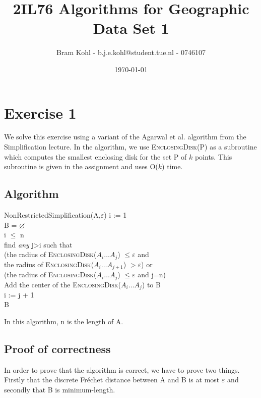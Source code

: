 \documentclass[a4paper,11pt]{article}
\title{
	2IL76 Algorithms for Geographic Data Set 1 \\
}
\author{
	Bram Kohl - b.j.e.kohl@student.tue.nl - 0746107
}
\date{\today}
\begin{document}
	\maketitle
	
\section*{Exercise 1}
We solve this exercise using a variant of the Agarwal et al. algorithm from the Simplification lecture. In the algorithm, we use \textsc{EnclosingDisk(P)} as a subroutine which computes the smallest enclosing disk for the set P of $k$ points. This subroutine is given in the assignment and uses O($k$) time.\\
\subsection*{Algorithm}
\begin{algorithm}{NonRestrictedSimplification}{(A,$\varepsilon$)}
	i := 1\\
	B = $\varnothing$\\
	\qwhile i $\leq$ n \\
	find \textit{any} j>i such that \\
	\hspace{4ex} (the radius of \textsc{EnclosingDisk($A_i\dots A_j$)} $\leq \varepsilon$ and\\
	\hspace{4ex} the radius of \textsc{EnclosingDisk($A_i\dots A_{j+1}$)} $> \varepsilon$) or\\
	\hspace{4ex} (the radius of \textsc{EnclosingDisk($A_i\dots A_j$)} $\leq \varepsilon$ and j=n)\\
	Add the center of the \textsc{EnclosingDisk($A_i\dots A_j$)} to B\\
	i := j + 1 \qend \\
	\qreturn B
\end{algorithm} 
In this algorithm, n is the length of A.
\subsection*{Proof of correctness}
In order to prove that the algorithm is correct, we have to prove two things. Firstly that the discrete Fr\'{e}chet distance between A and B is at most $\varepsilon$ and secondly that B is minimum-length.\\
\end{document}
